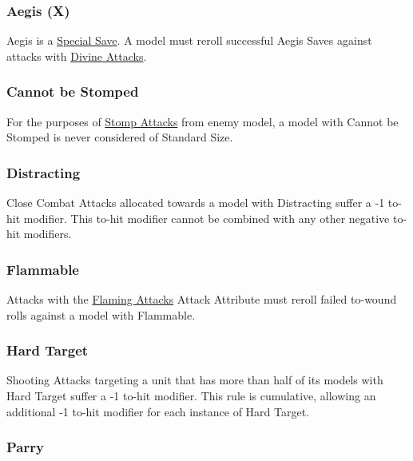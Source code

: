 \subsubsection{Aegis (X)}
\label{aegis}

Aegis is a \hyperref[special_saves]{Special Save}. A model must reroll successful Aegis Saves against attacks with \hyperref[divine_attacks]{Divine Attacks}.

\subsubsection{Cannot be Stomped}
\label{cannot_be_stomped}

For the purposes of \hyperref[stomp_attacks]{Stomp Attacks} from enemy model, a model with Cannot be Stomped is never considered of Standard Size.

\subsubsection{Distracting}
\label{distracting}

Close Combat Attacks allocated towards a model with Distracting suffer a -1 to-hit modifier. This to-hit modifier cannot be combined with any other negative to-hit modifiers. 



\subsubsection{Flammable}
\label{flammable}

Attacks with the \hyperref[flaming_attacks]{Flaming Attacks} Attack Attribute must reroll failed to-wound rolls against a model with Flammable. 

\subsubsection{Hard Target}
\label{hard_target}

Shooting Attacks targeting a unit that has more than half of its models with Hard Target suffer a -1 to-hit modifier. This rule is cumulative, allowing an additional -1 to-hit modifier for each instance of Hard Target.



\subsubsection{Parry}
\label{parry}

